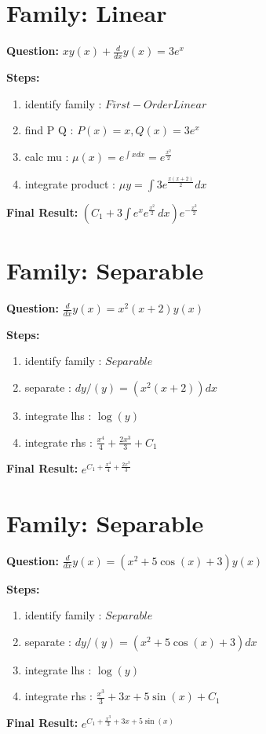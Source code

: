 \documentclass{article}
\begin{document}
\section*{Family: Linear}
\textbf{Question:} $x y{\left(x \right)} + \frac{d}{d x} y{\left(x \right)} = 3 e^{x}$

\textbf{Steps:}
\begin{enumerate}
\item identify family :  $First-Order Linear$
\item find P Q :  $P(x)=x, Q(x)=3 e^{x}$
\item calc mu :  $\mu(x) = e^{\int x dx} = e^{\frac{x^{2}}{2}}$
\item integrate product :  $\mu y = \int 3 e^{\frac{x \left(x + 2\right)}{2}} dx$
\end{enumerate}
\textbf{Final Result:} $\left(C_{1} + 3 \int e^{x} e^{\frac{x^{2}}{2}}\, dx\right) e^{- \frac{x^{2}}{2}}$

\section*{Family: Separable}
\textbf{Question:} $\frac{d}{d x} y{\left(x \right)} = x^{2} \left(x + 2\right) y{\left(x \right)}$

\textbf{Steps:}
\begin{enumerate}
\item identify family :  $Separable$
\item separate :  $dy / (y) = (x^{2} \left(x + 2\right)) dx$
\item integrate lhs :  $\log{\left(y \right)}$
\item integrate rhs :  $\frac{x^{4}}{4} + \frac{2 x^{3}}{3} + C_1$
\end{enumerate}
\textbf{Final Result:} $e^{C_{1} + \frac{x^{4}}{4} + \frac{2 x^{3}}{3}}$

\section*{Family: Separable}
\textbf{Question:} $\frac{d}{d x} y{\left(x \right)} = \left(x^{2} + 5 \cos{\left(x \right)} + 3\right) y{\left(x \right)}$

\textbf{Steps:}
\begin{enumerate}
\item identify family :  $Separable$
\item separate :  $dy / (y) = (x^{2} + 5 \cos{\left(x \right)} + 3) dx$
\item integrate lhs :  $\log{\left(y \right)}$
\item integrate rhs :  $\frac{x^{3}}{3} + 3 x + 5 \sin{\left(x \right)} + C_1$
\end{enumerate}
\textbf{Final Result:} $e^{C_{1} + \frac{x^{3}}{3} + 3 x + 5 \sin{\left(x \right)}}$
\end{document}
